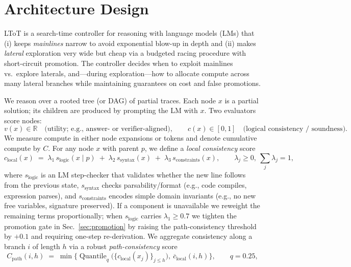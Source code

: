 \documentclass{article}
\begin{document}
\section{Architecture Design}
\label{section:architecture-design}

LToT is a search-time controller for reasoning with language models (LMs) that
(i) keeps \emph{mainlines} narrow to avoid exponential blow-up in depth and
(ii) makes \emph{lateral} exploration very wide but cheap via a budgeted racing procedure with short-circuit promotion.
The controller decides when to exploit mainlines vs.\ explore laterals, and—during exploration—how to allocate compute across many lateral branches while maintaining guarantees on cost and false promotions.

\vspace{0.5em}
We reason over a rooted tree (or DAG) of partial traces.
Each node $x$ is a partial solution; its children are produced by prompting the LM with $x$.
Two evaluators score nodes:
\[
v(x) \in \mathbb{R} \quad \text{(utility; e.g., answer- or verifier-aligned)}, \qquad
c(x) \in [0,1] \quad \text{(logical consistency / soundness)}.
\]
We measure compute in either node expansions or tokens and denote cumulative compute by $C$.
For any node $x$ with parent $p$, we define a \emph{local consistency} score
\begin{equation}
c_{\text{local}}(x)\;=\;\lambda_1\,s_{\text{logic}}(x\mid p)\;+\;\lambda_2\,s_{\text{syntax}}(x)\;+\;\lambda_3\,s_{\text{constraints}}(x),
\qquad \lambda_j\!\ge 0,\ \sum_j \lambda_j=1,
\end{equation}
where $s_{\text{logic}}$ is an LM step-checker that validates whether the new line follows from the previous state,
$s_{\text{syntax}}$ checks parsability/format (e.g., code compiles, expression parses), and
$s_{\text{constraints}}$ encodes simple domain invariants (e.g., no new free variables, signature preserved).
If a component is unavailable we reweight the remaining terms proportionally; when $s_{\text{logic}}$ carries $\lambda_1\ge 0.7$ we tighten the promotion gate in Sec.~\ref{sec:promotion} by raising the path-consistency threshold by $+0.1$ and requiring one-step re-derivation.
We aggregate consistency along a branch $i$ of length $h$ via a robust \emph{path-consistency} score
\begin{equation}
C_{\text{path}}(i,h)\;=\;\min\!\Big\{\operatorname{Quantile}_{q}\big(\{c_{\text{local}}(x_j)\}_{j\le h}\big),\ \overline{c}_{\text{local}}(i,h)\Big\},
\qquad q=0.25,
\end{equation}
\end{document}
